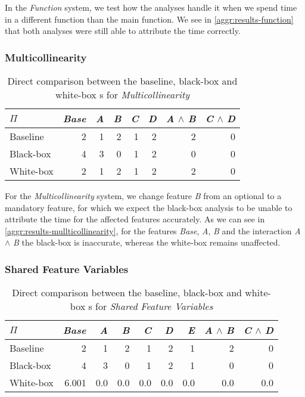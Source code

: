 In the \emph{Function} system, we test how the analyses handle it when we spend time in a different function than the main function. 
We see in \autoref{aggr:results-function} that both analyses were still able to attribute the time correctly.

\subsubsection*{Multicollinearity}

\begin{table}[H]
    \centering
    \begin{tabular}{lrrrrrrr}
    \toprule
    $\Pi$    & \emph{Base} & \emph{A} & \emph{B} & \emph{C} & \emph{D} & \emph{A} $\land$ \emph{B} & \emph{C} $\land$ \emph{D}  \\ \midrule
    Baseline & 2    & 1 & 2 & 1 & 2 & 2           & 0            \\
    Black-box & 4   & 3 & 0 & 1 & 2 & 0           & 0            \\
    White-box & 2   & 1 & 2 & 1 & 2 & 2           & 0            \\ \bottomrule
    \end{tabular}  
    \caption{Direct comparison between the baseline, black-box and white-box {\perfInfluenceModel}s for \emph{Multicollinearity}}
    \label{aggr:results-mullticollinearity}
\end{table}

For the \emph{Multicollinearity} system, we change feature \emph{B} from an optional to a mandatory feature, 
for which we expect the black-box analysis to be unable to attribute the time for the affected features accurately. 
As we can see in \autoref{aggr:results-mullticollinearity}, for the features \emph{Base}, \emph{A}, \emph{B} and 
the interaction \emph{A} $\land$ \emph{B} the black-box is inaccurate, whereas the white-box remains unaffected.

\subsubsection*{Shared Feature Variables}

\begin{table}[H]
    \centering
    \begin{tabular}{lrrrrrrrr}
    \toprule
    $\Pi$    & \emph{Base} & \emph{A} & \emph{B} & \emph{C} & \emph{D} & \emph{E}& \emph{A} $\land$ \emph{B} & \emph{C} $\land$ \emph{D}  \\ \midrule
    Baseline & 2    & 1 & 2 & 1 & 2 & 1 & 2           & 0            \\
    Black-box & 4   & 3 & 0 & 1 & 2 & 1 & 0           & 0            \\
    White-box  &  6.001 &  0.0 &  0.0 &  0.0 &  0.0 &  0.0 &     0.0 &     0.0\\\bottomrule
    \end{tabular}  
    \caption{Direct comparison between the baseline, black-box and white-box {\perfInfluenceModel}s for \emph{Shared Feature Variables}}
    \label{aggr:results-shared-feature}
\end{table}

